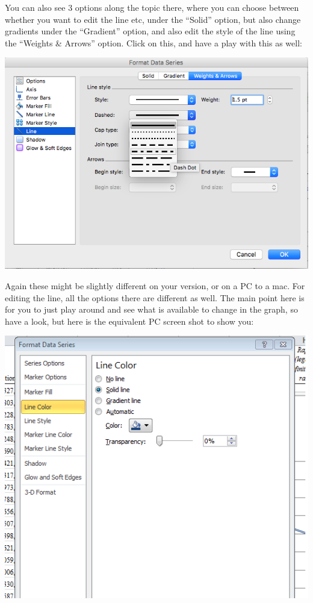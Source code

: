 \documentclass[]{book}
\theoremstyle{definition}
\theoremstyle{definition}
\theoremstyle{definition}
\theoremstyle{remark}
\begin{document}
You can also see 3 options along the topic there, where you can choose
between whether you want to edit the line etc, under the ``Solid''
option, but also change gradients under the ``Gradient'' option, and
also edit the style of the line using the ``Weights \& Arrows'' option.
Click on this, and have a play with this as well:

\includegraphics{imgs/desc_line_type.png}

Again these might be slightly different on your version, or on a PC to a
mac. For editing the line, all the options there are different as well.
The main point here is for you to just play around and see what is
available to change in the graph, so have a look, but here is the
equivalent PC screen shot to show you:

\includegraphics{imgs/pc_line_2.png}
\end{document}
